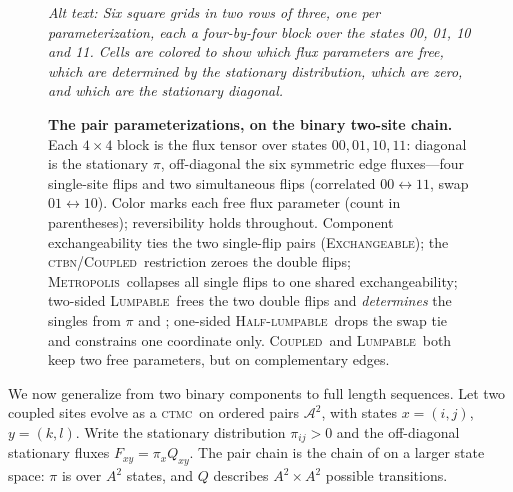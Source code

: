 \documentclass[11pt]{article}
\newcommand{\CTBN}{\textsc{ctbn}}
\newcommand{\CTMC}{\textsc{ctmc}}
\newcommand{\Coupledm}{\textsc{Coupled}}
\newcommand{\Exchm}{\textsc{Exchangeable}}
\newcommand{\Metrop}{\textsc{Metropolis}}
\newcommand{\Lumpm}{\textsc{Lumpable}}
\newcommand{\Halflump}{\textsc{Half-lumpable}}
\newcommand{\Xset}{\mathcal{A}}
\begin{document}
\begin{figure}[t]
\begin{minipage}[c]{0.60\textwidth}
{}
\end{minipage}\hfill
\begin{minipage}[c]{0.37\textwidth}
\caption{\textbf{The pair parameterizations, on the binary two-site chain.} Each
$4\times4$ block is the flux tensor over states $00,01,10,11$: diagonal is the stationary
$\pi$, off-diagonal the six symmetric edge fluxes---four single-site flips and two
simultaneous flips (correlated $00\!\leftrightarrow\!11$, swap
$01\!\leftrightarrow\!10$). Color marks each free flux parameter (count in
parentheses); reversibility holds throughout. Component
exchangeability ties the two single-flip pairs (\Exchm); the
\CTBN/\Coupledm\ restriction zeroes the double flips; \Metrop\ collapses all single flips
to one shared exchangeability; two-sided \Lumpm\ frees the two double flips and
\emph{determines} the singles from $\pi$ and ; one-sided \Halflump\ drops
the swap tie and constrains one coordinate only. \Coupledm\ and \Lumpm\ both keep two
free parameters, but on complementary edges.
}
\label{fig:params}

{\footnotesize\itshape Alt text: Six square grids in two rows of three, one per parameterization, each a four-by-four block over the states 00, 01, 10 and 11. Cells are colored to show which flux parameters are free, which are determined by the stationary distribution, which are zero, and which are the stationary diagonal.}
\end{minipage}
\end{figure}
We now generalize from two binary components to full length sequences.
Let two coupled sites evolve as a \CTMC\ on ordered pairs
$\Xset^2$, with states $x=(i,j)$, $y=(k,l)$.
Write the stationary distribution $\pi_{ij}>0$ and the off-diagonal stationary
fluxes $F_{xy}=\pi_xQ_{xy}$.
The pair chain is the chain of  on a larger state space:
$\pi$ is over $A^2$ states, and
$Q$ describes $A^2\times A^2$ possible transitions.
\end{document}
